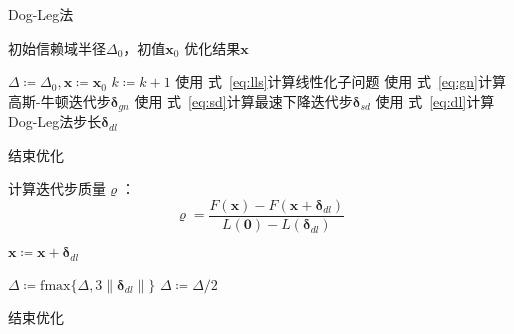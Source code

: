 \begin{algorithm}[htb!]
\caption{Dog-Leg法}
\begin{algorithmic}
    \Require 初始信赖域半径$\Delta_0$，初值$\bm{x}_0$
    \Ensure 优化结果$\bm{x}$

    \State $\Delta \coloneqq \Delta_0, \bm{x} \coloneqq \bm{x}_0$
        \State $k \coloneqq k+1$
        \State 使用 式~\eqref{eq:lls}计算线性化子问题
        \State 使用 式~\eqref{eq:gn}计算高斯-牛顿迭代步$\bm{\delta}_{gn}$
        \State 使用 式~\eqref{eq:sd}计算最速下降迭代步$\bm{\delta}_{sd}$
        \State 使用 式~\eqref{eq:dl}计算Dog-Leg法步长$\bm{\delta}_{dl}$

            \State 结束优化
        \EndIf

        \State 计算迭代步质量$\varrho$：
        \[
            \varrho = \frac {F(\bm{x})-F(\bm{x}+\bm{\delta}_{dl})}
                            {L(\bm{0})-L(\bm{\delta}_{dl})}
        \]

            \State $\bm{x} \coloneqq \bm{x} + \bm{\delta}_{dl}$
        \EndIf

            \State $\Delta \coloneqq \text{fmax}\{\Delta,3\left\|\bm{\delta}_{dl}\right\|\}$
            \State $\Delta \coloneqq \Delta/2$
        \EndIf

            \State 结束优化
        \EndIf
    \EndFor
\end{algorithmic}
\label{alg:dogleg}
\end{algorithm}
